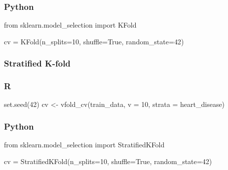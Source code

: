 \documentclass[
  letterpaper,
  DIV=11,
  numbers=noendperiod]{scrreprt}
\newenvironment{Shaded}{\begin{snugshade}}{\end{snugshade}}
\newcommand{\AttributeTok}[1]{\textcolor[rgb]{0.40,0.46,0.14}{#1}}
\newcommand{\DecValTok}[1]{\textcolor[rgb]{0.68,0.00,0.00}{#1}}
\newcommand{\FunctionTok}[1]{\textcolor[rgb]{0.28,0.35,0.67}{#1}}
\newcommand{\ImportTok}[1]{\textcolor[rgb]{0.00,0.46,0.62}{#1}}
\newcommand{\NormalTok}[1]{\textcolor[rgb]{0.00,0.46,0.62}{#1}}
\newcommand{\OperatorTok}[1]{\textcolor[rgb]{0.37,0.37,0.37}{#1}}
\newcommand{\OtherTok}[1]{\textcolor[rgb]{0.00,0.46,0.62}{#1}}
\newcommand{\VariableTok}[1]{\textcolor[rgb]{0.07,0.07,0.07}{#1}}
\begin{document}
\hypertarget{python-53}{%
\subsubsection{Python}\label{python-53}}

\begin{Shaded}
\begin{Highlighting}[]
\ImportTok{from}\NormalTok{ sklearn.model\_selection }\ImportTok{import}\NormalTok{ KFold}

\NormalTok{cv }\OperatorTok{=}\NormalTok{ KFold(n\_splits}\OperatorTok{=}\DecValTok{10}\NormalTok{, shuffle}\OperatorTok{=}\VariableTok{True}\NormalTok{, random\_state}\OperatorTok{=}\DecValTok{42}\NormalTok{)}
\end{Highlighting}
\end{Shaded}

\hypertarget{stratified-k-fold}{%
\subsubsection{Stratified K-fold}\label{stratified-k-fold}}

\hypertarget{r-54}{%
\subsubsection{R}\label{r-54}}

\begin{Shaded}
\begin{Highlighting}[]
\FunctionTok{set.seed}\NormalTok{(}\DecValTok{42}\NormalTok{)}
\NormalTok{cv }\OtherTok{\textless{}{-}} \FunctionTok{vfold\_cv}\NormalTok{(train\_data, }\AttributeTok{v =} \DecValTok{10}\NormalTok{, }\AttributeTok{strata =}\NormalTok{ heart\_disease)}
\end{Highlighting}
\end{Shaded}

\hypertarget{python-54}{%
\subsubsection{Python}\label{python-54}}

\begin{Shaded}
\begin{Highlighting}[]
\ImportTok{from}\NormalTok{ sklearn.model\_selection }\ImportTok{import}\NormalTok{ StratifiedKFold}

\NormalTok{cv }\OperatorTok{=}\NormalTok{ StratifiedKFold(n\_splits}\OperatorTok{=}\DecValTok{10}\NormalTok{, shuffle}\OperatorTok{=}\VariableTok{True}\NormalTok{, random\_state}\OperatorTok{=}\DecValTok{42}\NormalTok{)}
\end{Highlighting}
\end{Shaded}
\end{document}
